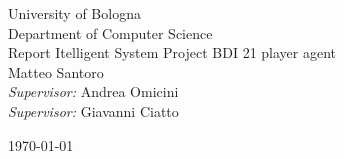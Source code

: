 \documentclass[a4paper,11pt,oneside]{book}
\begin{document}
    
    \frontmatter
    
    \begin{titlepage}      
        \begin{center}
            {\LARGE University of Bologna\\[0.5cm]
            Department of Computer Science}\\[2cm]
			
            \linespread{1.2}\huge {
                Report Itelligent System Project            
            }
            \huge {
                BDI 21 player agent 
            }
            \linespread{1}~\\[2cm]
            {\Large 
                Matteo Santoro
            }\\[1cm] 
            

            {\large 
                \emph{Supervisor:} Andrea Omicini}\\[1cm] %
                {\large 
                \emph{Supervisor:} Giavanni Ciatto}\\[1cm] %
            
            \vfill
            
            \today %
        \end{center}
    \end{titlepage}
    
\end{document}
